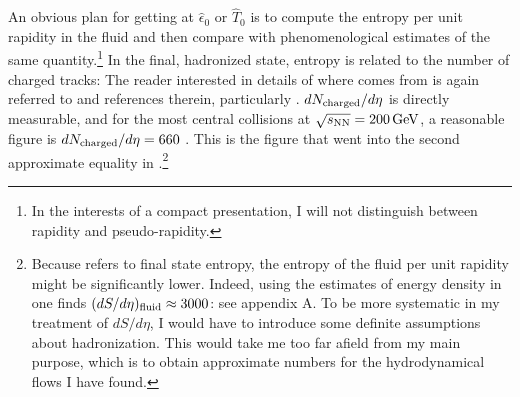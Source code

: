 \documentclass[12pt]{article}
\begin{document}
An obvious plan for getting at $\hat\epsilon_0$ or $\hat{T}_0$ is to compute the entropy per unit rapidity in the fluid and then compare with phenomenological estimates of the same quantity.\footnote{In the interests of a compact presentation, I will not distinguish between rapidity and pseudo-rapidity.}  In the final, hadronized state, entropy is related to the number of charged tracks:
The reader interested in details of where  comes from is again referred to \cite{Gubser:2008pc} and references therein, particularly \cite{Pal:2003rz}.  $dN_{\rm charged} / d\eta$ is directly measurable, and for the most central collisions at $\sqrt{s_{\rm NN}} = 200\,{\rm GeV}$, a reasonable figure is $dN_{\rm charged} / d\eta = 660$ \cite{Back:2004je}.  This is the figure that went into the second approximate equality in .\footnote{Because  refers to final state entropy, the entropy of the fluid per unit rapidity might be significantly lower.  Indeed, using the estimates of energy density in \cite{Adcox:2004mh} one finds $(dS/d\eta)_{\rm fluid} \approx 3000$: see appendix A.  To be more systematic in my treatment of $dS/d\eta$, I would have to introduce some definite assumptions about hadronization.  This would take me too far afield from my main purpose, which is to obtain approximate numbers for the hydrodynamical flows I have found.}
\end{document}
